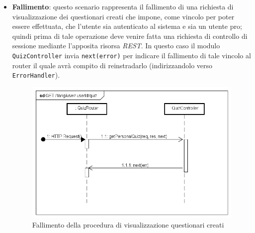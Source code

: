 \begin{itemize}
\item \textbf{Fallimento}: questo scenario rappresenta il fallimento di una richiesta di visualizzazione dei questionari creati che impone, come vincolo per poter essere effettuata, che l'utente sia autenticato al sistema e sia un utente pro; quindi prima di tale operazione deve venire fatta una richiesta di controllo di sessione mediante l'apposita risorsa \textit{REST}. In questo caso il modulo \texttt{QuizController} invia \texttt{next(error)} per indicare il fallimento di tale vincolo al router il quale avrà compito di reinstradarlo (indirizzandolo verso \texttt{ErrorHandler}).
\label{Fallimento della procedura di visualizzazione questionari creati}
\begin{figure}[ht]
	\centering
	\includegraphics[scale=0.55]{UML/DiagrammiDiSequenza/Back-end/GET__lang_user_userId_quiz_failure.png}
	\caption{Fallimento della procedura di visualizzazione questionari creati}
\end{figure}
\FloatBarrier
\end{itemize}

